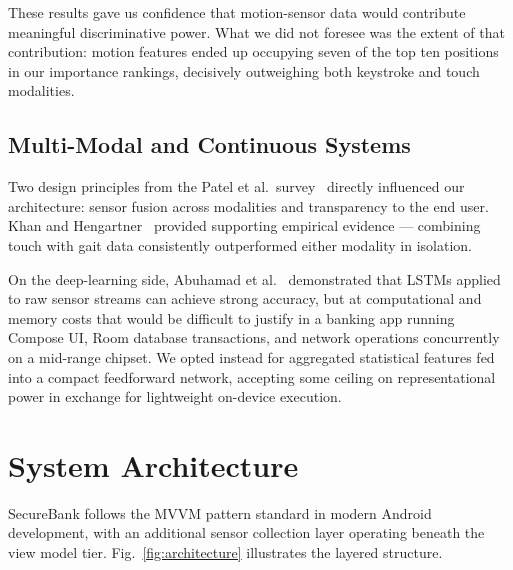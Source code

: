 \documentclass[conference]{IEEEtran}
\begin{document}
These results gave us confidence that motion-sensor data would contribute meaningful discriminative power. What we did not foresee was the extent of that contribution: motion features ended up occupying seven of the top ten positions in our importance rankings, decisively outweighing both keystroke and touch modalities.

\subsection{Multi-Modal and Continuous Systems}

Two design principles from the Patel et al.\ survey~\cite{patel2016continuous} directly influenced our architecture: sensor fusion across modalities and transparency to the end user. Khan and Hengartner~\cite{khan2014gait} provided supporting empirical evidence --- combining touch with gait data consistently outperformed either modality in isolation.

On the deep-learning side, Abuhamad et al.~\cite{li2020continuous} demonstrated that LSTMs applied to raw sensor streams can achieve strong accuracy, but at computational and memory costs that would be difficult to justify in a banking app running Compose UI, Room database transactions, and network operations concurrently on a mid-range chipset. We opted instead for aggregated statistical features fed into a compact feedforward network, accepting some ceiling on representational power in exchange for lightweight on-device execution.


\section{System Architecture}
\label{sec:architecture}

SecureBank follows the MVVM pattern standard in modern Android development, with an additional sensor collection layer operating beneath the view model tier. Fig.~\ref{fig:architecture} illustrates the layered structure.
\end{document}
